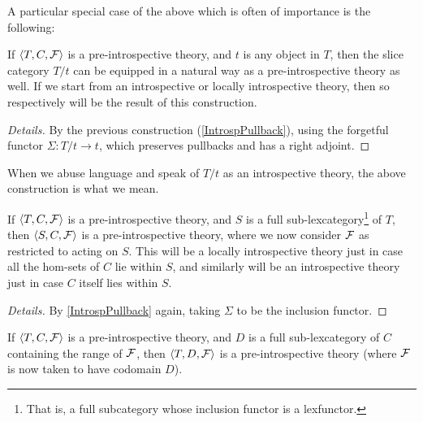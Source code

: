 
A particular special case of the above which is often of importance is the following:

\begin{construction}\label{IntrospSlice}
If $\langle T, C, \mathcal{F} \rangle$ is a pre-introspective theory, and $t$ is any object in $T$, then the slice category $T/t$ can be equipped in a natural way as a pre-introspective theory as well. If we start from an introspective or locally introspective theory, then so respectively will be the result of this construction.
\end{construction}
\begin{proof}[Details]
By the previous construction (\cref{IntrospPullback}), using the forgetful functor $\Sigma : T/t \to t$, which preserves pullbacks and has a right adjoint.
\end{proof}

When we abuse language and speak of $T/t$ as an introspective theory, the above construction is what we mean.

\begin{construction}\label{SubPreIntrosp}
If $\langle T, C, \mathcal{F} \rangle$ is a pre-introspective theory, and $S$ is a full sub-lexcategory\footnote{That is, a full subcategory whose inclusion functor is a lexfunctor.} of $T$, then $\langle S, C, \mathcal{F} \rangle$ is a pre-introspective theory, where we now consider $\mathcal{F}$ as restricted to acting on $S$. This will be a locally introspective theory just in case all the hom-sets of $C$ lie within $S$, and similarly will be an introspective theory just in case $C$ itself lies within $S$.
\end{construction}
\begin{proof}[Details]
By \cref{IntrospPullback} again, taking $\Sigma$ to be the inclusion functor.
\end{proof}

\begin{construction}\label{SubCPreIntrosp}
If $\langle T, C, \mathcal{F} \rangle$ is a pre-introspective theory, and $D$ is a full sub-lexcategory of $C$ containing the range of $\mathcal{F}$, then $\langle T, D, \mathcal{F} \rangle$ is a pre-introspective theory (where $\mathcal{F}$ is now taken to have codomain $D$).
\end{construction}

